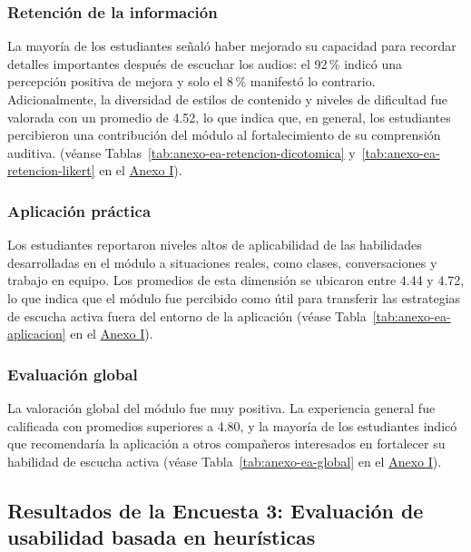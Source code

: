 \subsubsection*{Retención de la información}

La mayoría de los estudiantes señaló haber mejorado su capacidad para recordar detalles importantes después de escuchar los audios: el 92\,\% indicó una percepción positiva de mejora y solo el 8\,\% manifestó lo contrario. Adicionalmente, la diversidad de estilos de contenido y niveles de dificultad fue valorada con un promedio de 4.52, lo que indica que, en general, los estudiantes percibieron una contribución del módulo al fortalecimiento de su comprensión auditiva. (véanse Tablas~\ref{tab:anexo-ea-retencion-dicotomica} y~\ref{tab:anexo-ea-retencion-likert} en el \hyperref[anexo:encuestas]{Anexo I}).

\subsubsection*{Aplicación práctica}

Los estudiantes reportaron niveles altos de aplicabilidad de las habilidades desarrolladas en el módulo a situaciones reales, como clases, conversaciones y trabajo en equipo. Los promedios de esta dimensión se ubicaron entre 4.44 y 4.72, lo que indica que el módulo fue percibido como útil para transferir las estrategias de escucha activa fuera del entorno de la aplicación (véase Tabla~\ref{tab:anexo-ea-aplicacion} en el \hyperref[anexo:encuestas]{Anexo I}).

\subsubsection*{Evaluación global}

La valoración global del módulo fue muy positiva. La experiencia general fue calificada con promedios superiores a 4.80, y la mayoría de los estudiantes indicó que recomendaría la aplicación a otros compañeros interesados en fortalecer su habilidad de escucha activa (véase Tabla~\ref{tab:anexo-ea-global} en el \hyperref[anexo:encuestas]{Anexo I}).

\vspace{0.4cm}

\subsection{Resultados de la Encuesta 3: Evaluación de usabilidad basada en heurísticas}


